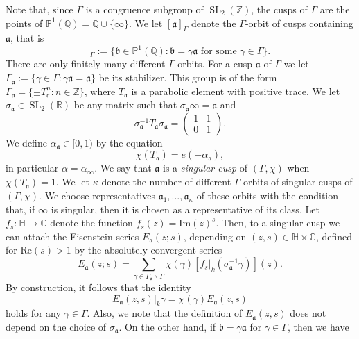 \documentclass{article}
\theoremstyle{named}
\newcommand{\Z}{\mathbb{Z}}
\newcommand{\Q}{\mathbb{Q}}
\newcommand{\CC}{\mathbb{C}}
\newcommand{\Hyp}{\mathbb{H}}
\newcommand{\R}{\mathbb{R}}
\renewcommand{\a}{\mathfrak{a}}
\renewcommand{\b}{\mathfrak{b}}
\renewcommand{\P}{\mathbb{P}}
\DeclareMathOperator{\SL}{SL}
\begin{document}
Note that, since $\Gamma$ is a congruence subgroup of $\SL_2(\Z)$,  the cusps of $\Gamma$ are the points of $\P^1(\Q) = \Q \cup \{\infty\}$. We let $[\a]_\Gamma$ denote the $\Gamma$-orbit of cusps containing $\a$, that is 
\begin{equation*}
    [\a]_\Gamma := \{\b \in \P^1(\Q): \b = \gamma \a \text{ for some }\gamma \in \Gamma\}.
\end{equation*}
There are only finitely-many different $\Gamma$-orbits. For a cusp $\a$ of $\Gamma$ we let $\Gamma_\a := \{\gamma \in \Gamma: \gamma \a = \a\}$ be its stabilizer. This group is of the form $\Gamma_\a = \{\pm T_\a^n : n \in \Z\}$, where $T_\a$ is a parabolic element with positive trace. We let $\sigma_\a \in \SL_2(\R)$ be any matrix such that $\sigma_\a \infty = \a$ and
\begin{equation*}
    \sigma^{-1}_\a T_\a \sigma_\a = \begin{pmatrix}
        1 & 1\\
        0 & 1
    \end{pmatrix}.
\end{equation*}
We define $\alpha_\a \in [0, 1)$ by the equation
\begin{equation*}
    \chi(T_\a) = e(-\alpha_\a),
\end{equation*}
in particular $\alpha = \alpha_\infty$. We say that $\a$ is a \emph{singular cusp} of $(\Gamma, \chi)$ when $\chi(T_\a) = 1$. We let $\kappa$ denote the number of different $\Gamma$-orbits of singular cusps of $(\Gamma, \chi)$. We choose representatives $\a_1, \ldots, \a_{\kappa}$ of these orbits with the condition that, if $\infty$ is singular, then it is chosen as a representative of its class. Let $f_s: \Hyp \rightarrow \CC$ denote the function $f_s(z) = \text{Im}(z)^s$. Then, to a singular cusp we can attach the Eisenstein series $E_\a(z; s)$, depending on $(z, s)\in \Hyp \times \CC$, defined for $\text{Re}(s) > 1$ by the absolutely convergent series 
\begin{equation}\label{eq:defofeisensteinseries}
    E_\a(z; s) = \sum_{\gamma \in \Gamma_\a \backslash \Gamma} \overline{\chi(\gamma)}\left[f_s|_k (\sigma_\a^{-1}\gamma)\right](z).
\end{equation}
By construction, it follows that the identity 
\begin{equation*}
    E_\a(z, s)|_k \gamma = \chi(\gamma)E_\a(z, s)
\end{equation*}
holds for any $\gamma \in \Gamma$. Also, we note that the definition of $E_\a(z, s)$ does not depend on the choice of $\sigma_\a$. On the other hand, if $\b = \gamma \a$ for $\gamma \in \Gamma$, then we have 
\end{document}
